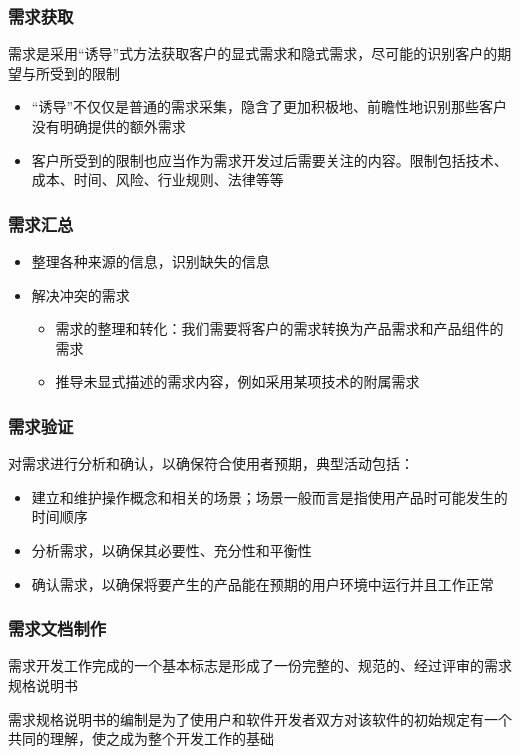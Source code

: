 \subsubsection{需求获取}
需求是采用“诱导”式方法获取客户的显式需求和隐式需求，尽可能的识别客户的期望与所受到的限制
\begin{itemize}
    \item “诱导”不仅仅是普通的需求采集，隐含了更加积极地、前瞻性地识别那些客户没有明确提供的额外需求
    \item 客户所受到的限制也应当作为需求开发过后需要关注的内容。限制包括技术、成本、时间、风险、行业规则、法律等等
\end{itemize}

\subsubsection{需求汇总}
\begin{itemize}
    \item 整理各种来源的信息，识别缺失的信息
    \item 解决冲突的需求
    \begin{itemize}
        \item 需求的整理和转化：我们需要将客户的需求转换为产品需求和产品组件的需求
        \item 推导未显式描述的需求内容，例如采用某项技术的附属需求
    \end{itemize}
\end{itemize}

\subsubsection{需求验证}
对需求进行分析和确认，以确保符合使用者预期，典型活动包括：
\begin{itemize}
    \item 建立和维护操作概念和相关的场景；场景一般而言是指使用产品时可能发生的时间顺序
    \item 分析需求，以确保其必要性、充分性和平衡性
    \item 确认需求，以确保将要产生的产品能在预期的用户环境中运行并且工作正常
\end{itemize}

\subsubsection{需求文档制作}
需求开发工作完成的一个基本标志是形成了一份完整的、规范的、经过评审的需求规格说明书

需求规格说明书的编制是为了使用户和软件开发者双方对该软件的初始规定有一个共同的理解，使之成为整个开发工作的基础

